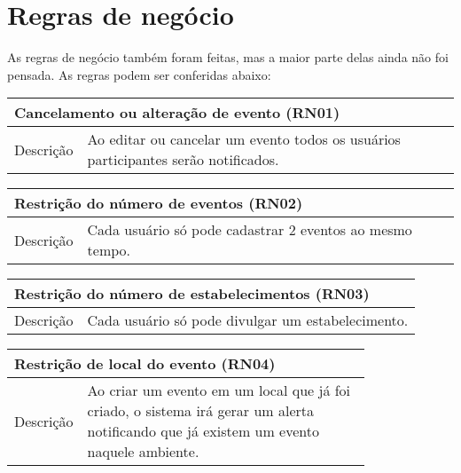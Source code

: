 \documentclass{article}
\begin{document}
			
				\section{Regras de negócio} 
				
				\par As regras de negócio também foram feitas, mas a maior parte delas ainda não foi pensada. As regras podem ser conferidas abaixo:
			
				\begin{center}
			   	 \begin{tabular}{|l|l|}
				\hline
			 	\multicolumn{2}{|p{\textwidth}|}{
					{\large \textbf{Cancelamento ou alteração de evento (RN01)}}
				}  \\
				\hline
			
				Descrição & Ao editar ou cancelar um evento todos os usuários participantes serão notificados. \\ 
			   
			    	\hline
			   	 \end{tabular} 
			    	\end{center}
			
				\begin{center}
			   	 \begin{tabular}{|l|l|}
				\hline
			 	\multicolumn{2}{|p{\textwidth}|}{
					{\large \textbf{Restrição do número de eventos (RN02)}}
				}  \\
				\hline
			
				Descrição & Cada usuário só pode cadastrar 2 eventos ao mesmo tempo. \\ 
			   
			    	\hline
			   	 \end{tabular} 
			    	\end{center}
			
				\begin{center}
			   	 \begin{tabular}{|l|l|}
				\hline
			 	\multicolumn{2}{|p{\textwidth}|}{
					{\large \textbf{Restrição do número de estabelecimentos (RN03)}}
				}  \\
				\hline
			
				Descrição & Cada usuário só pode divulgar um estabelecimento. \\ 
			   
			    	\hline
			   	 \end{tabular} 
			    	\end{center}
			
				\begin{center}
			   	 \begin{tabular}{|l|p{0.8\linewidth}|}
				\hline
			 	\multicolumn{2}{|p{\textwidth}|}{
					{\large \textbf{Restrição de local do evento (RN04)}}
				}  \\
				\hline
			
				Descrição & Ao criar um evento em um local que já foi criado, o sistema irá gerar um alerta notificando que já existem um evento naquele ambiente. \\ 
			   
			    	\hline
			   	 \end{tabular} 
			    	\end{center}
			
\end{document}

